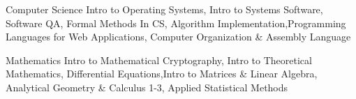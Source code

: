 
\vspace{0mm}
\begin{cvskills}

  \vspace{1mm}

  \cvskill
    {Computer Science} %
    {Intro to Operating Systems, Intro to Systems Software, Software QA, Formal Methods In CS, Algorithm Implementation,\newline Programming Languages for Web Applications, Computer Organization \& Assembly Language} %

   \cvskill
    {Mathematics} %
	{Intro to Mathematical Cryptography, Intro to Theoretical Mathematics, Differential Equations,\newline Intro to Matrices \& Linear Algebra, Analytical Geometry \& Calculus 1-3, Applied Statistical Methods} %


\end{cvskills}